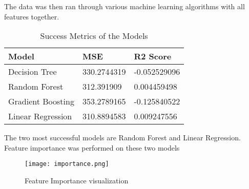 \documentclass[titlepage]{article}
\begin{document}
The data was then ran through various machine learning algorithms with all features together. 
\begin{table}[H]
    \centering 
    \caption{Success Metrics of the Models}
    \begin{tabular}{lll}
    \hline
        Model & MSE & R2 Score \\ \hline
        Decision Tree & 330.2744319 & -0.052529096 \\ 
        Random Forest & 312.391909 & 0.004459498 \\ 
        Gradient Boosting & 353.2789165 & -0.125840522 \\ 
        Linear Regression & 310.8894583 & 0.009247556 \\ \hline
    \end{tabular}
\end{table} 
\noindent The two most successful models are Random Forest and Linear Regression. Feature importance was performed on these two models 
\begin{figure}
    \centering 
    \hspace*{-2cm}
    \texttt{[image: importance.png]}
    \caption{Feature Importance visualization}
    \label{fig:enter-label}
\end{figure} 
\end{document}
